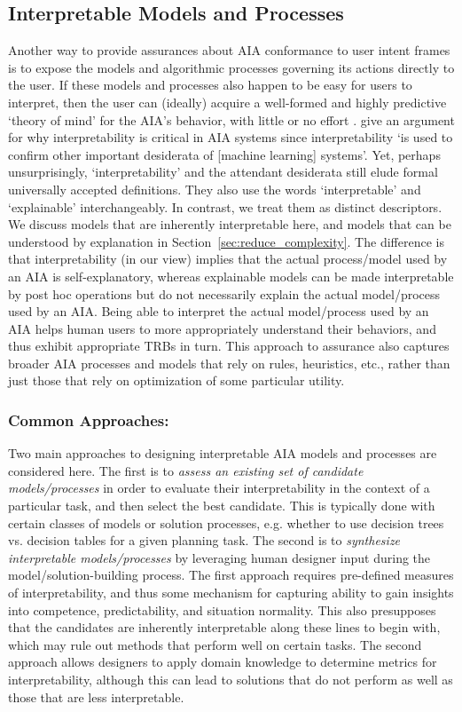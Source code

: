 \subsection{Interpretable Models and Processes} \label{sec:interp_models}
Another way to provide assurances about AIA conformance to user intent frames is to expose the models and algorithmic processes governing its actions directly to the user. If these models and processes also happen to be easy for users to interpret, then the user can (ideally) acquire a well-formed and highly predictive `theory of mind' for the AIA's behavior, with little or no effort . 
\citet{Doshi-Velez2017-xy} give an argument for why interpretability is critical in AIA systems since interpretability `is used to confirm other important desiderata of [machine learning] systems'. 
Yet, perhaps unsurprisingly, `interpretability' and the attendant desiderata still elude formal universally accepted definitions. 
They also use the words `interpretable' and `explainable' interchangeably. In contrast, we treat them as distinct descriptors. We discuss models that are inherently interpretable here, and models that can be understood by explanation in Section~\ref{sec:reduce_complexity}.  The difference is that interpretability (in our view) implies that the actual process/model used by an AIA is self-explanatory, whereas explainable models can be made interpretable by post hoc operations but do not necessarily explain the actual model/process used by an AIA. 
Being able to interpret the actual model/process used by an AIA helps human users to more appropriately understand their behaviors, and thus exhibit appropriate TRBs in turn. This approach to assurance also captures broader AIA processes and models that rely on rules, heuristics, etc., rather than just those that rely on optimization of some particular utility. 

\subsubsection{Common Approaches:}
Two main approaches to designing interpretable AIA models and processes are considered here. 
The first is to \emph{assess an existing set of candidate models/processes} in order to evaluate their interpretability in the context of a particular task, and then select the best candidate. 
This is typically done with certain classes of models or solution processes, e.g. whether to use decision trees vs. decision tables for a given planning task. 
The second is to \emph{synthesize interpretable models/processes} by leveraging human designer input during the model/solution-building process. 
The first approach requires pre-defined measures of interpretability, and thus some mechanism for capturing ability to gain insights into competence, predictability, and situation normality. This also presupposes that the candidates are inherently interpretable along these lines to begin with, which may rule out methods that perform well on certain tasks. 
The second approach allows designers to apply domain knowledge to determine metrics for interpretability, although this can lead to solutions that do not perform as well as those that are less interpretable. 

